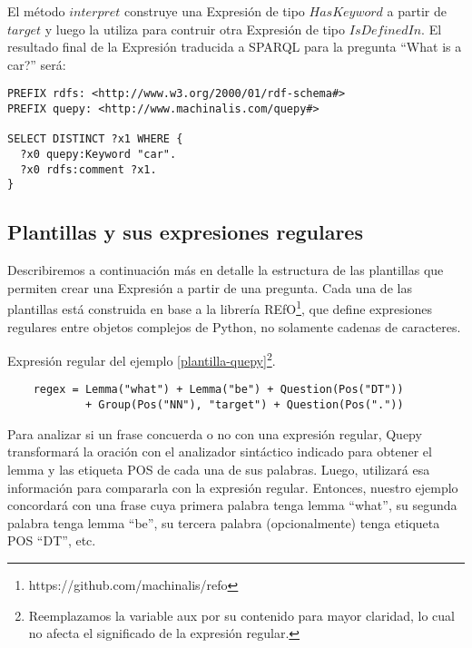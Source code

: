 El método $interpret$ construye una Expresión de tipo $HasKeyword$ a partir de $target$ y luego la utiliza para contruir otra Expresión de tipo $IsDefinedIn$. El resultado final de la Expresión traducida a SPARQL para la pregunta ``What is a car?'' será:

\vspace{5mm}

\begin{lstlisting}
PREFIX rdfs: <http://www.w3.org/2000/01/rdf-schema#>
PREFIX quepy: <http://www.machinalis.com/quepy#>

SELECT DISTINCT ?x1 WHERE {
  ?x0 quepy:Keyword "car".
  ?x0 rdfs:comment ?x1.
}
\end{lstlisting}

\vspace{5mm}

\subsection{Plantillas y sus expresiones regulares}

Describiremos a continuación más en detalle la estructura de las plantillas que permiten crear una Expresión a partir de una pregunta. Cada una de las plantillas está construida en base a la librería REfO\footnote{https://github.com/machinalis/refo}, que define expresiones regulares entre objetos complejos de Python, no solamente cadenas de caracteres.

\begin{example}\label{regex} Expresión regular del ejemplo \ref{plantilla-quepy}\footnote{Reemplazamos la variable aux por su contenido para mayor claridad, lo cual no afecta el significado de la expresión regular.}.
    \begin{lstlisting}
    regex = Lemma("what") + Lemma("be") + Question(Pos("DT"))
            + Group(Pos("NN"), "target") + Question(Pos("."))
    \end{lstlisting}
\end{example}

Para analizar si un frase concuerda o no con una expresión regular, Quepy transformará la oración con el analizador sintáctico indicado para obtener el lemma y las etiqueta POS de cada una de sus palabras. Luego, utilizará esa información para compararla con la expresión regular. Entonces, nuestro ejemplo concordará con una frase cuya primera palabra tenga lemma ``what'', su segunda palabra tenga lemma ``be'', su tercera palabra (opcionalmente) tenga etiqueta POS ``DT'', etc.

